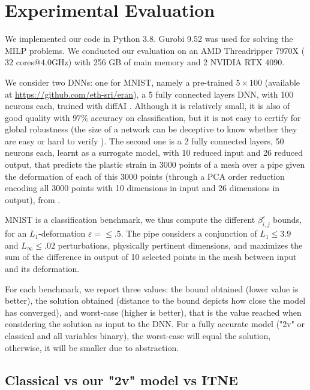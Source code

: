 	\section{Experimental Evaluation}
	
	We implemented our code in Python 3.8.
	Gurobi 9.52 was used for solving the MILP problems. We conducted our evaluation on an AMD Threadripper 7970X ($32$ cores$@4.0$GHz) with 256 GB of main memory and 2 NVIDIA RTX 4090. 
	
	We consider two DNNs: one for MNIST, namely a pre-trained $5\times 100$ (available at \url{https://github.com/eth-sri/eran}), a 5 fully connected layers DNN, with 100 neurons each,	trained with diffAI \cite{deeppoly}. 
	Although it is relatively small, it is also of good quality with $97\%$ accuracy on classification, but it is not easy to certify for global robustness (the size of a network can be deceptive to know whether they are easy or hard to verify \cite{ATVA25}).  
	The second one is a 2 fully connected layers, 50 neurons each, learnt as a surrogate model, with 10 reduced input and 26 reduced output, that predicts the plastic strain in 3000 points of a mesh over a pipe given the deformation of each of this 3000 points (through a PCA order reduction \cite{Paco} encoding all 3000 points with 10 dimensions in input and 26 dimensions in output), from \cite{aiware}.
	
	MNIST is a classification benchmark, we thus compute the different $\beta^{\varepsilon}_{i,j}$ bounds, for an $L_1$-deformation $\varepsilon = \leq .5$. 
	The pipe considers a conjunction of 
	$L_1 \leq 3.9$ and $L_\infty \leq .02$ perturbations, physically pertinent dimensions, and maximizes the sum of the difference in output of 10 selected points in the mesh between input and its deformation.

For each benchmark, we report three values: the bound obtained (lower value is better), the solution obtained (distance to the bound depicts how close the model has converged), and worst-case (higher is better), that is the value reached when considering the solution as input to the DNN. For a fully accurate model ("2v" or classical and all variables binary), the worst-case will equal the solution, otherwise, it will be smaller due to abstraction.

\subsection{Classical vs our "2v" model vs ITNE}


